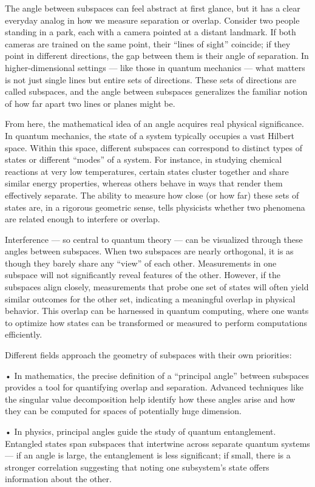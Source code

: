 The angle between subspaces can feel abstract at first glance, but it has a clear everyday analog in how we measure separation or overlap. Consider two people standing in a park, each with a camera pointed at a distant landmark. If both cameras are trained on the same point, their “lines of sight” coincide; if they point in different directions, the gap between them is their angle of separation. In higher-dimensional settings — like those in quantum mechanics — what matters is not just single lines but entire sets of directions. These sets of directions are called subspaces, and the angle between subspaces generalizes the familiar notion of how far apart two lines or planes might be.

From here, the mathematical idea of an angle acquires real physical significance. In quantum mechanics, the state of a system typically occupies a vast Hilbert space. Within this space, different subspaces can correspond to distinct types of states or different “modes” of a system. For instance, in studying chemical reactions at very low temperatures, certain states cluster together and share similar energy properties, whereas others behave in ways that render them effectively separate. The ability to measure how close (or how far) these sets of states are, in a rigorous geometric sense, tells physicists whether two phenomena are related enough to interfere or overlap.

Interference — so central to quantum theory — can be visualized through these angles between subspaces. When two subspaces are nearly orthogonal, it is as though they barely share any “view” of each other. Measurements in one subspace will not significantly reveal features of the other. However, if the subspaces align closely, measurements that probe one set of states will often yield similar outcomes for the other set, indicating a meaningful overlap in physical behavior. This overlap can be harnessed in quantum computing, where one wants to optimize how states can be transformed or measured to perform computations efficiently.

Different fields approach the geometry of subspaces with their own priorities:

• In mathematics, the precise definition of a “principal angle” between subspaces provides a tool for quantifying overlap and separation. Advanced techniques like the singular value decomposition help identify how these angles arise and how they can be computed for spaces of potentially huge dimension.

• In physics, principal angles guide the study of quantum entanglement. Entangled states span subspaces that intertwine across separate quantum systems — if an angle is large, the entanglement is less significant; if small, there is a stronger correlation suggesting that noting one subsystem’s state offers information about the other.

